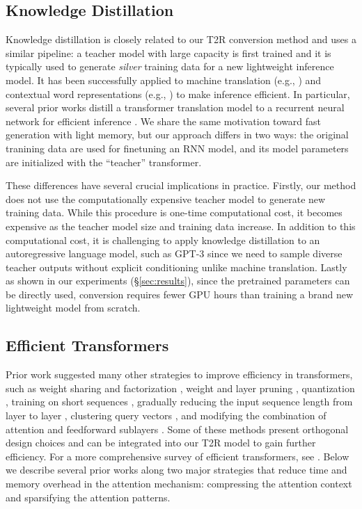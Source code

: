 \documentclass[11pt,a4paper]{article}
\newcommand{\TRNN}{T2R\xspace}
\begin{document}
\subsection{Knowledge Distillation}
Knowledge distillation \cite{Hinton2015DistillingTK} is closely related to our \TRNN conversion method and uses a similar pipeline: a teacher model with large capacity is first trained and it is typically used to generate \textit{silver} training data for a new lightweight inference model. It has been successfully applied to machine translation (e.g., \citealp{Kim2016SequenceLevelKD, Gu2017NonAutoregressiveNM}) and contextual word representations (e.g., \citealp{distillbert, sun-etal-2020-mobilebert, minilm, minilmv2}) to make inference efficient.
In particular, several prior works distill a transformer translation model to a recurrent neural network for efficient inference \cite{senellart-etal-2018-opennmt, kim-etal-2019-research}. 
We share the same motivation toward fast generation with light memory, but our approach differs in two ways: the original tranining data are used for finetuning an RNN model, and its model parameters are initialized with the ``teacher'' transformer.

These differences have several crucial implications in practice.
Firstly, our method does not use the computationally expensive teacher model to generate new training data.
While this procedure is one-time computational cost, it becomes expensive as the teacher model size and training data increase.
In addition to this computational cost, it is challenging to apply knowledge distillation to an autoregressive language model, such as GPT-3 \cite{gpt3} since we need to sample diverse teacher outputs without explicit conditioning unlike machine translation.
Lastly as shown in our experiments (\S\ref{sec:results}), since the pretrained parameters can be directly used, conversion requires fewer GPU hours than training a brand new lightweight model from scratch.

\subsection{Efficient Transformers}
Prior work suggested many other strategies to improve efficiency in transformers, such as weight sharing and factorization \cite{universal, albert}, weight and layer pruning \cite{weightpruning,layerdrop}, quantization \cite{q8bert,quantshen}, training on short sequences \cite{shortformer}, gradually reducing the input sequence length from layer to layer \cite{Dai2020FunnelTransformerFO}, clustering query vectors \cite{clustering}, and modifying the combination of attention and feedforward sublayers \cite{press-etal-2020-sand,modifysublayers}.
Some of these methods present orthogonal design choices and can be integrated into our \TRNN model to gain further efficiency. 
For a more comprehensive survey of efficient transformers, see \citet{Tay2020EfficientTA}.
Below we describe several prior works along two major strategies that reduce time and memory overhead in the attention mechanism: compressing the attention context and sparsifying the attention patterns.
\end{document}
